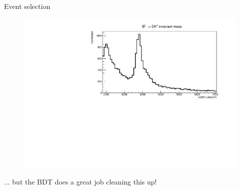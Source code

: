 \documentclass{beamer}
\begin{document}
\begin{frame}{Event selection}
  \begin{figure}
    \centering
    \includegraphics[width = 1.0\textwidth]{Plots/BmassFinalSelection.pdf}
  \end{figure}
  \begin{center}
    ... but the BDT does a great job cleaning this up!
  \end{center}
\end{frame}
\end{document}
